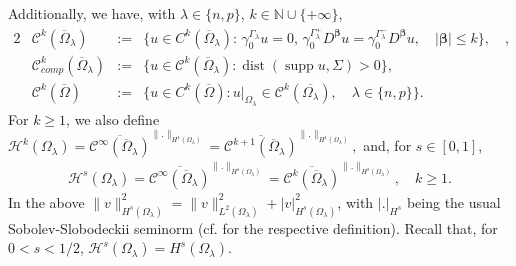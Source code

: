 \documentclass[report]{elsarticle}
\numberwithin{theorem}{section}
\renewcommand{\vec}[1]{\mathbf{#1}}
\begin{document}
%	
Additionally, we have, with  $\lambda\in \{n,p\}$, $k\in \mathbb{N}\cup\{+\infty\}$, 
\begin{alignat*}{2}
	&\mathcal{C}^k(\overline{\Omega}_{\lambda}) & := &\{u \in C^k(\overline{\Omega}_{\lambda}): \, \gamma_{0}^{\Gamma_{\lambda}}u=0, \, \gamma_0^{\Gamma_{\lambda}^+}D^{\vec{\beta}}u=\gamma_0^{\Gamma_{\lambda}^-}D^{\vec{\beta}}u, \quad |\vec{\beta}|\leq k\},  \quad,\\
	&\mathcal{C}^k_{comp}(\overline{\Omega}_{\lambda}) & := &\{u \in \mathcal{C}^k(\overline{\Omega}_{\lambda}): \operatorname{dist}(\operatorname{supp}u,\Sigma)>0\},\\	&\mathcal{C}^k(\overline{\Omega})&:=&\{u \in C^k(\overline{\Omega}):  \left. u\right|_{\Omega_{\lambda}}\in \mathcal{C}^k(\overline{\Omega_{\lambda}}), \quad \lambda\in \{n,p\}\}.
\end{alignat*}
For $k\geq 1$, we also define $\mathcal{H}^k(\Omega_{\lambda})=\overline{\mathcal{C}^{\infty}(\overline{\Omega}_{\lambda})}^{\|.\|_{H^1(\Omega_{\lambda})}}=\overline{\mathcal{C}^{k+1}(\overline{\Omega}_{\lambda})}^{\|.\|_{H^1(\Omega_{\lambda})}},$
and, for $s\in [0,1]$, 
\begin{align*}
	\mathcal{H}^s(\Omega_{\lambda})=\overline{\mathcal{C}^{\infty}(\overline{\Omega}_{\lambda})}^{\|.\|_{H^s(\Omega_{\lambda})}}=\overline{\mathcal{C}^k(\overline{\Omega}_{\lambda})}^{\|.\|_{H^s(\Omega_{\lambda})}}, \quad k\geq 1.
\end{align*}
In the above $\|v\|_{H^s(\Omega_{\lambda})}^2=\|v\|^2_{L^2(\Omega_{\lambda})}+|v|_{H^s(\Omega_{\lambda})}^2$, with $|.|_{H^s}$ being the usual Sobolev-Slobodeckii seminorm (cf. \cite[(3.18)]{mclean} for the respective definition). Recall that, for $0<s<1/2$, $\mathcal{H}^s(\Omega_{\lambda})=H^s(\Omega_{\lambda})$. 	
\end{document}
